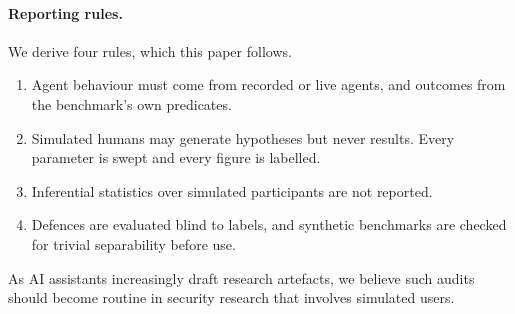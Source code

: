 \documentclass[preprint,12pt,nonatbib]{elsarticle}
\theoremstyle{remark}
\begin{document}
\paragraph{Reporting rules.} We derive four rules, which this paper follows.
\begin{enumerate}[leftmargin=*,itemsep=1pt]
\item Agent behaviour must come from recorded or live agents, and outcomes from
  the benchmark's own predicates.
\item Simulated humans may generate hypotheses but never results. Every
  parameter is swept and every figure is labelled.
\item Inferential statistics over simulated participants are not reported.
\item Defences are evaluated blind to labels, and synthetic benchmarks are
  checked for trivial separability before use.
\end{enumerate}
As AI assistants increasingly draft research artefacts, we believe such audits
should become routine in security research that involves simulated users.
\end{document}
